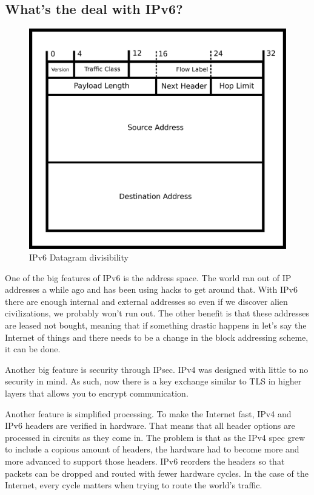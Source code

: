 \subsection{What's the deal with IPv6?}

\begin{figure}[H]
  \centering
\includegraphics[width=.8\textwidth]{networking/drawings/ipv6_datagram.eps}
\caption{IPv6 Datagram divisibility}
\end{figure}

One of the big features of IPv6 is the address space.
The world ran out of IP addresses a while ago and has been using hacks to get around that.
With IPv6 there are enough internal and external addresses so even if we discover alien civilizations, we probably won't run out.
The other benefit is that these addresses are leased not bought, meaning that if something drastic happens in let's say the Internet of things and there needs to be a change in the block addressing scheme, it can be done.

Another big feature is security through IPsec.
IPv4 was designed with little to no security in mind.
As such, now there is a key exchange similar to TLS in higher layers that allows you to encrypt communication.

Another feature is simplified processing.
To make the Internet fast, IPv4 and IPv6 headers are verified in hardware.
That means that all header options are processed in circuits as they come in.
The problem is that as the IPv4 spec grew to include a copious amount of headers, the hardware had to become more and more advanced to support those headers.
IPv6 reorders the headers so that packets can be dropped and routed with fewer hardware cycles.
In the case of the Internet, every cycle matters when trying to route the world's traffic.

